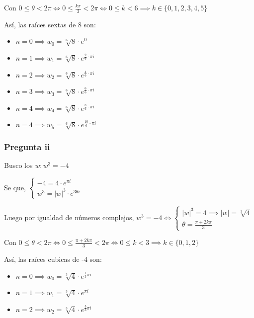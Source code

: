 Con $ 0 \leq \theta < 2\pi \iff 0 \leq \frac{k\pi}{3} < 2\pi \iff 0 \leq k < 6 \implies k \in \{ 0,1,2,3,4,5 \} $

Así, las raíces sextas de 8 son:
\begin{itemize}
    \item $ n = 0 \implies w_0 = \sqrt[6]{8} \cdot e^0 $
    \item $ n = 1 \implies w_1 = \sqrt[6]{8} \cdot e^{\frac{2}{6} \cdot \pi i} $
    \item $ n = 2 \implies w_2 = \sqrt[6]{8} \cdot e^{\frac{4}{6} \cdot \pi i} $
    \item $ n = 3 \implies w_3 = \sqrt[6]{8} \cdot e^{\frac{6}{6} \cdot \pi i} $
    \item $ n = 4 \implies w_4 = \sqrt[6]{8} \cdot e^{\frac{8}{6} \cdot \pi i} $
    \item $ n = 4 \implies w_5 = \sqrt[6]{8} \cdot e^{\frac{10}{6} \cdot \pi i} $
\end{itemize}

\subsubsection{Pregunta ii}

Busco los $ w: w^3 = -4 $

Se que, $ \begin{cases}
    -4 = 4 \cdot e^{\pi i} \\
    w^3 = |w|^3 \cdot e^{3 \theta i}
\end{cases} $

Luego por igualdad de números complejos, $ w^3 = -4 \iff \begin{cases}
    |w|^3 = 4 \implies |w| = \sqrt[3]{4} \\
    \theta = \frac{\pi+2k\pi}{3}
\end{cases} $

Con $ 0 \leq \theta < 2\pi \iff 0 \leq \frac{\pi+2k\pi}{3} < 2\pi \iff 0 \leq k < 3 \implies k \in \{ 0,1,2 \} $

Así, las raíces cubicas de -4 son:
\begin{itemize}
    \item $ n = 0 \implies w_0 = \sqrt[3]{4} \cdot e^{\frac{1}{3} \pi i} $
    \item $ n = 1 \implies w_1 = \sqrt[3]{4} \cdot e^{\pi i} $
    \item $ n = 2 \implies w_2 = \sqrt[3]{4} \cdot e^{\frac{5}{3} \pi i} $
\end{itemize}

